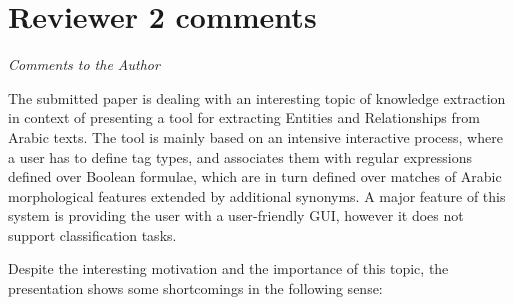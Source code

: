 \section*{Reviewer 2 comments}
\textit{Comments to the Author}



The submitted paper is dealing with an interesting topic 
of knowledge extraction in context of presenting a tool 
for extracting Entities and Relationships from Arabic texts. 
The tool is mainly based on an intensive interactive process, 
where a user has to define tag types, and associates them 
with regular expressions defined over Boolean formulae, 
which are in turn defined over matches of Arabic morphological 
features extended by additional synonyms. 
A major feature of this system is providing the user with a 
user-friendly GUI, however it does not support classification 
tasks.

\noindent{}


Despite the interesting motivation and the importance of 
this topic, the presentation shows some shortcomings in the 
following sense:

